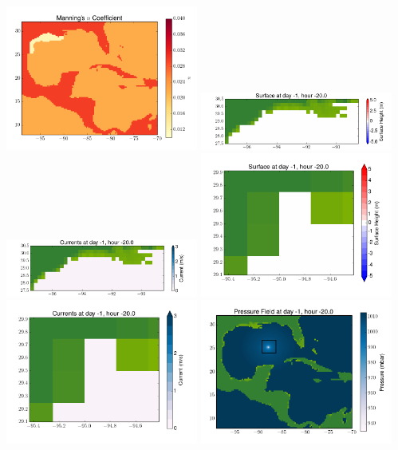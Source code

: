 \documentclass[11pt]{article}
\begin{document}
\vskip 10pt 
\includegraphics[width=0.475\textwidth]{frame0028fig3.png}
\includegraphics[width=0.475\textwidth]{frame0028fig4.png}
\vskip 10pt 
\includegraphics[width=0.475\textwidth]{frame0028fig5.png}
\includegraphics[width=0.475\textwidth]{frame0028fig6.png}
\vskip 10pt 
\includegraphics[width=0.475\textwidth]{frame0028fig7.png}
\includegraphics[width=0.475\textwidth]{frame0028fig8.png}
\end{document}

